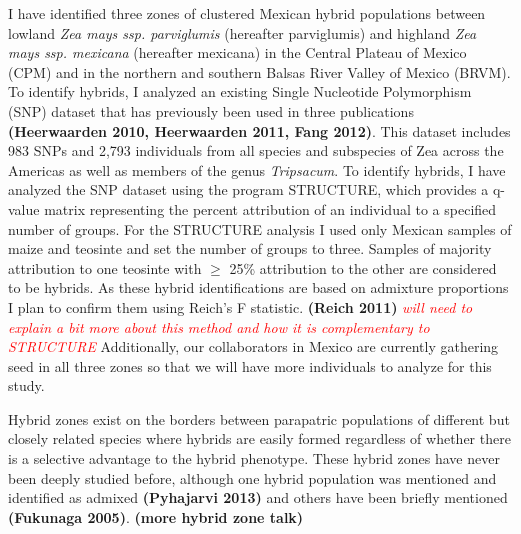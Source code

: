 \documentclass[12pt]{amsart}
\newcommand{\mbh}[1]{\textcolor{red}{ \emph{\scriptsize  #1}} }
\begin{document}
I have identified three zones of clustered Mexican hybrid populations between lowland \textit{Zea mays ssp. parviglumis} (hereafter parviglumis) and highland \textit{Zea mays ssp. mexicana} (hereafter mexicana) in the Central Plateau of Mexico (CPM) and in the northern and southern Balsas River Valley of Mexico (BRVM). 
To identify hybrids, I analyzed an existing Single Nucleotide Polymorphism (SNP) dataset that has previously been used in three publications \textbf{(Heerwaarden 2010, Heerwaarden 2011, Fang 2012)}.  
This dataset includes 983 SNPs and 2,793 individuals from all species and subspecies of Zea across the Americas as well as members of the genus \textit{Tripsacum}.  
To identify hybrids, I have analyzed the SNP dataset using the program STRUCTURE, which provides a q-value matrix representing the percent attribution of an individual to a specified number of groups.  
For the STRUCTURE analysis I used only Mexican samples of maize and teosinte and set the number of groups to three.
Samples of majority attribution to one teosinte with $\geq$ 25\% attribution to the other are considered to be hybrids.
As these hybrid identifications are based on admixture proportions I plan to confirm them using Reich's F statistic. \textbf{(Reich  2011)}\mbh{will need to explain a bit more about this method and how it is complementary to STRUCTURE}
Additionally, our collaborators in Mexico are currently gathering seed in all three zones so that we will have more individuals to analyze for this study.

Hybrid zones exist on the borders between parapatric populations of different but closely related species where hybrids are easily formed regardless of whether there is a selective advantage to the hybrid phenotype.
These hybrid zones have never been deeply studied before, although one hybrid population was mentioned and identified as admixed \textbf{(Pyhajarvi 2013)}  and others have been briefly mentioned \textbf{(Fukunaga 2005)}. \textbf{(more hybrid zone talk)} %
\end{document}
